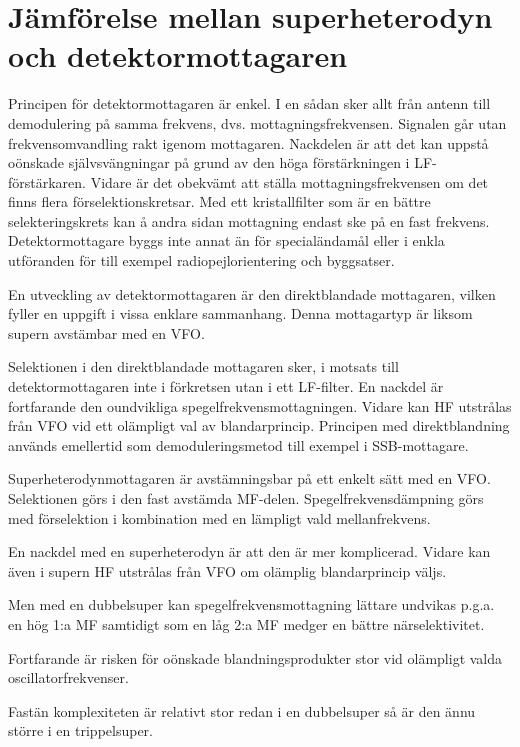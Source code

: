 \section[Jämförelse superheterodyn]{Jämförelse mellan superheterodyn och detektormottagaren}
\label{superheterojämförelse}

Principen för detektormottagaren är enkel.
I en sådan sker allt från antenn till demodulering på samma frekvens,
dvs. mottagningsfrekvensen.
Signalen går utan frekvensomvandling rakt igenom mottagaren.
Nackdelen är att det kan uppstå oönskade självsvängningar på grund av den
höga förstärkningen i LF-förstärkaren.
Vidare är det obekvämt att ställa mottagningsfrekvensen om det finns flera
förselektionskretsar.
Med ett kristallfilter som är en bättre selekteringskrets kan å andra sidan
mottagning endast ske på en fast frekvens.
Detektormottagare byggs inte annat än för specialändamål eller i enkla
utföranden för till exempel radiopejlorientering och byggsatser.

En utveckling av detektormottagaren är den direktblandade mottagaren,
vilken fyller en uppgift i vissa enklare sammanhang.
Denna mottagartyp är liksom supern avstämbar med en VFO.

Selektionen i den direktblandade mottagaren sker, i motsats till
detektormottagaren inte i förkretsen utan i ett LF-filter.
En nackdel är fortfarande den oundvikliga spegelfrekvensmottagningen.
Vidare kan HF utstrålas från VFO vid ett olämpligt val av blandarprincip.
Principen med direktblandning används emellertid som demoduleringsmetod till exempel
i SSB-mottagare.

Superheterodynmottagaren är avstämningsbar på ett enkelt sätt med en VFO.
Selektionen görs i den fast avstämda MF-delen.
Spegelfrekvensdämpning görs med förselektion i kombination med en lämpligt
vald mellanfrekvens.

En nackdel med en superheterodyn är att den är mer komplicerad.
Vidare kan även i supern HF utstrålas från VFO om olämplig blandarprincip väljs.

Men med en dubbelsuper kan spegelfrekvensmottagning lättare undvikas
p.g.a. en hög 1:a MF samtidigt som en låg 2:a MF medger en bättre
närselektivitet.

Fortfarande är risken för oönskade blandningsprodukter stor vid
olämpligt valda oscillatorfrekvenser.

Fastän komplexiteten är relativt stor redan i en dubbelsuper så är den
ännu större i en trippelsuper.
